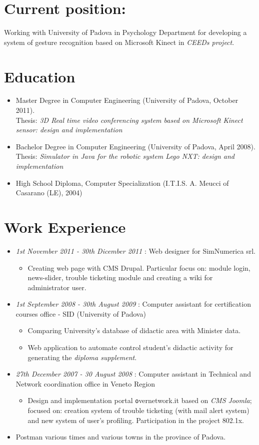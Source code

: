 \documentclass[pdftex,a4paper,12pt,twoside,titlepage,italian,openright]{article}
\newcommand{\sezione}[1]{\section*{\textcolor{theme-color!70}{#1}}}
\begin{document}
\vspace{0.5cm}
\sezione{Current position:}
 	Working with University of Padova in Psychology Department for developing a system of gesture recognition based on Microsoft Kinect in \textit{CEEDs project}.
\sezione{Education}
\begin{itemize}
	\item Master Degree in Computer Engineering (University of Padova, October 2011).\\
	Thesis: {\itshape 3D Real time video conferencing system based on Microsoft Kinect sensor: design and implementation }
	\item Bachelor Degree in Computer Engineering (University of Padova, April 2008). \\Thesis:
	{\itshape Simulator in Java for the robotic system Lego NXT: design and implementation}
	\item High School Diploma, Computer Specialization (I.T.I.S. A. Meucci of Casarano (LE), 2004)
\end{itemize}
\sezione{Work Experience}
\begin{itemize}
\item {\itshape 1st November 2011 - 30th Dicember 2011} : Web designer for SimNumerica srl.
	\begin{itemize}
			\item Creating web page with CMS Drupal. Particular focus on: module login, news-slider, 
		trouble ticketing module and creating a wiki for administrator user.
	\end{itemize}
\item {\itshape 1st September 2008 - 30th August 2009} : Computer assistant for certification courses office - SID (University of Padova)	
	\begin{itemize}
		\item Comparing University's database of didactic area with Minister data.
		\item Web application to automate control student's didactic activity for generating the \textit{diploma supplement}.
	\end{itemize}
	\newpage 
\item {\itshape 27th December 2007 - 30 August 2008} : Computer assistant in Technical and Network coordination office in Veneto Region
	\begin{itemize}
		\item Design and implementation portal {\texttt overnetwork.it} based on \textit{CMS Joomla}; focused on: creation system of trouble ticketing (with mail alert system) and new system of user's profiling. Participation in the project 802.1x.
	\end{itemize}
	\item Postman various times and various towns in the province of Padova.
\end{itemize}
\end{document}
